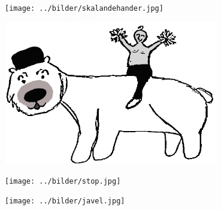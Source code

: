 

\sclearpage

\sclearpage

\begin{intersong}
	\begin{center}
		\texttt{[image: ../bilder/skalandehander.jpg]} 
	\end{center}
\end{intersong}
\sclearpage

\begin{intersong}
	\begin{center}
		\includegraphics[width=0.7\textwidth]{../bilder/fardigabilder/CamillasFardigaBilder/Isbjorn2.png} 
	\end{center}
	\vspace{5mm}
\end{intersong}





\begin{intersong}
	\begin{center}
		\texttt{[image: ../bilder/stop.jpg]} 
	\end{center}
\end{intersong}
\sclearpage


\sclearpage

\begin{intersong}
\begin{center}
\texttt{[image: ../bilder/javel.jpg]} 
\end{center}
\end{intersong}
\sclearpage











